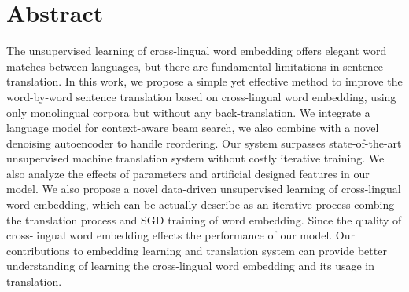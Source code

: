 \chapter{Abstract}

The unsupervised learning of cross-lingual word embedding offers elegant word matches between languages, but there are fundamental limitations in sentence translation. In this work, we propose a simple yet effective method to improve the word-by-word sentence translation based on cross-lingual word embedding, using only monolingual corpora but without any back-translation. We integrate a language model for context-aware beam search, we also combine with a novel denoising autoencoder to handle reordering. Our system surpasses state-of-the-art unsupervised machine translation system without costly iterative training.  We also analyze the effects of parameters and artificial designed features in our model. We also propose a novel data-driven unsupervised learning of cross-lingual word embedding, which can be  actually describe as an iterative process combing the translation process and SGD training of word embedding. Since the quality of cross-lingual word embedding effects the performance of our model. Our contributions to embedding learning and translation system can provide better understanding of learning the cross-lingual word embedding and its usage in translation.